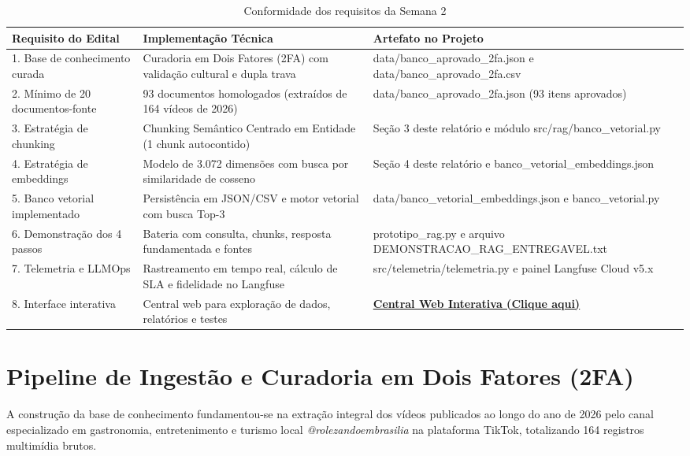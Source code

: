 \documentclass[11pt,a4paper]{article}
\begin{document}
\begin{table}[!htbp]
\centering
\small
\renewcommand{\arraystretch}{1.03}
\caption{Conformidade dos requisitos da Semana 2}
\begin{tabularx}{\textwidth}{p{4.0cm} p{4.6cm} X}
\toprule
\textbf{Requisito do Edital} & \textbf{Implementação Técnica} & \textbf{Artefato no Projeto} \\
\midrule
1. Base de conhecimento curada & Curadoria em Dois Fatores (2FA) com validação cultural e dupla trava & data/banco\_aprovado\_2fa.json e data/banco\_aprovado\_2fa.csv \\
2. Mínimo de 20 documentos-fonte & 93 documentos homologados (extraídos de 164 vídeos de 2026) & data/banco\_aprovado\_2fa.json (93 itens aprovados) \\
3. Estratégia de chunking & Chunking Semântico Centrado em Entidade (1 chunk autocontido) & Seção 3 deste relatório e módulo src/rag/banco\_vetorial.py \\
4. Estratégia de embeddings & Modelo de 3.072 dimensões com busca por similaridade de cosseno & Seção 4 deste relatório e banco\_vetorial\_embeddings.json \\
5. Banco vetorial implementado & Persistência em JSON/CSV e motor vetorial com busca Top-3 & data/\allowbreak banco\_vetorial\_embeddings.json e banco\_vetorial.py \\
6. Demonstração dos 4 passos & Bateria com consulta, chunks, resposta fundamentada e fontes & prototipo\_rag.py e arquivo DEMONSTRACAO\_RAG\_ENTREGAVEL.txt \\
7. Telemetria e LLMOps & Rastreamento em tempo real, cálculo de SLA e fidelidade no Langfuse & src/telemetria/telemetria.py e painel Langfuse Cloud v5.x \\
8. Interface interativa & Central web para exploração de dados, relatórios e testes & \href{https://orquestrador-roles.onrender.com/entregaveis}{\textbf{\underline{Central Web Interativa (Clique aqui)}}} \\
\bottomrule
\end{tabularx}
\vspace{0.1cm}
\end{table}

\section{Pipeline de Ingestão e Curadoria em Dois Fatores (2FA)}

A construção da base de conhecimento fundamentou-se na extração integral dos vídeos publicados ao longo do ano de 2026 pelo canal especializado em gastronomia, entretenimento e turismo local \textit{@rolezandoembrasilia} na plataforma TikTok, totalizando 164 registros multimídia brutos.
\end{document}
